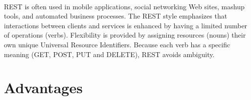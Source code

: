 \paragraph{}
REST is often used in mobile applications, social networking Web sites, mashup tools, and automated business processes. The REST style emphasizes that interactions between clients and services is enhanced by having a limited number of operations (verbs). Flexibility is provided by assigning resources (nouns) their own unique Universal Resource Identifiers. Because each verb has a specific meaning (GET, POST, PUT and DELETE), REST avoids ambiguity.

\section{Advantages}


